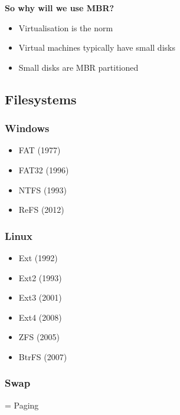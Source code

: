 \documentclass{article}
\begin{document}
\textbf{So why will we use MBR?}

\begin{itemize}
    \item Virtualisation is the norm
    \item Virtual machines typically have small disks
    \item Small disks are MBR partitioned
\end{itemize}



\subsection{Filesystems}

\subsubsection{Windows}

\begin{itemize}
    \item FAT (1977)
    \item FAT32 (1996)
    \item NTFS (1993)
    \item ReFS (2012)
\end{itemize}

\subsubsection{Linux}

\begin{itemize}
    \item Ext (1992)
    \item Ext2 (1993)
    \item Ext3 (2001)
    \item Ext4 (2008)
    \item ZFS (2005)
    \item BtrFS (2007)
\end{itemize}

\subsubsection{Swap}

= Paging
\end{document}

